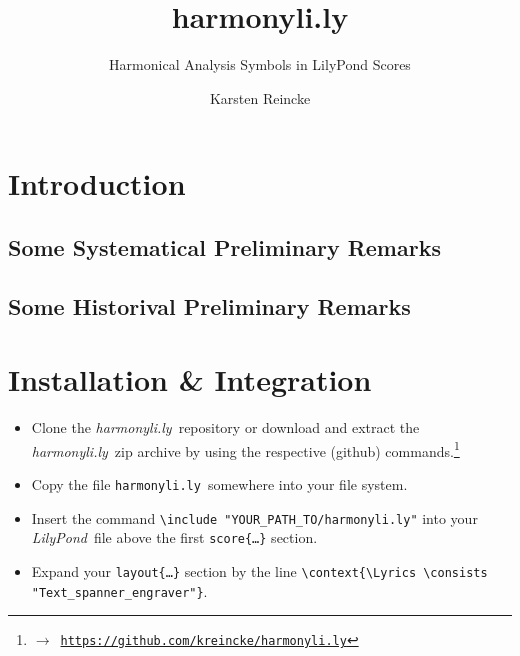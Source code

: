 \documentclass[
  DIV=calc,
  BCOR=5mm,
  12pt,
  headings=small,
  oneside,
  abstract=true,
  toc=bib,
  xcolor=dvipsnames,
  openany,
  ngerman,english]{scrartcl}
\newcommand{\ra}[0]{$\rightarrow$}
\newcommand{\lnkr}[1]{\ra\ \href{#1}{\texttt{#1}}}
\newcommand{\hlyn}[0]{\textit{harmonyli.ly}}
\newcommand{\hlyf}[0]{\texttt{harmonyli.ly}}
\newcommand{\lily}[0]{\textit{LilyPond}}
\begin{document}
\nocite{*}

\titlehead{Tutorial}
\subject{Release }
\title{harmonyli.ly}
\subtitle{Harmonical Analysis Symbols in LilyPond Scores}
\author{Karsten Reincke}


\maketitle

\footnotesize
\tableofcontents

\normalsize

\section{Introduction}
\subsection{Some Systematical Preliminary Remarks}
\subsection{Some Historival Preliminary Remarks}

\section{Installation \& Integration}
\begin{itemize}
  \item Clone the \hlyn\ repository or download and extract the \hlyn\ zip
  archive by using the respective (github)
  commands.\footnote{\lnkr{https://github.com/kreincke/harmonyli.ly}}
  \item Copy the file \hlyf\ somewhere into your file system.
  \item Insert the command \texttt{\textbackslash include 
  "YOUR\_PATH\_TO/harmonyli.ly"} into
  your \lily\ file above the first \texttt{score\{\ldots\}} section.
  \item Expand your \texttt{layout\{\ldots\}} section by the line
   \texttt{\textbackslash context\{\textbackslash Lyrics \textbackslash consists
   "Text\_spanner\_engraver"\}}.
\end{itemize}
\end{document}
